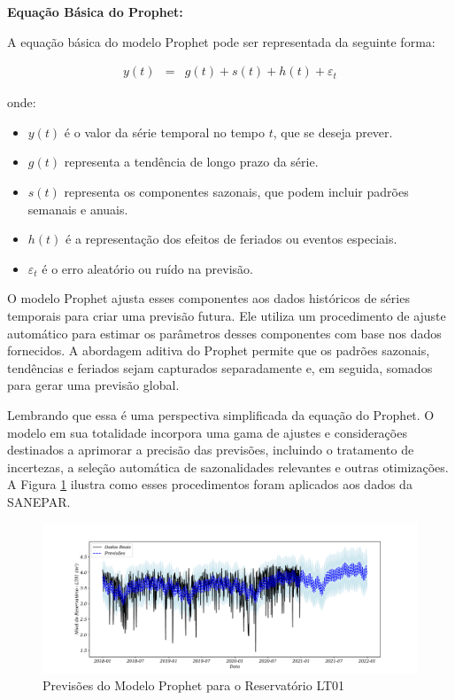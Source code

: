 \textbf{Equação Básica do Prophet:}

A equação básica do modelo Prophet pode ser representada da seguinte forma:

\begin{eqnarray}
	 y(t) &=& g(t) + s(t) + h(t) + \varepsilon_t 
\end{eqnarray}

onde:
\begin{itemize}
	\item \( y(t) \) é o valor da série temporal no tempo \( t \), que se deseja prever.
	\item \( g(t) \) representa a tendência de longo prazo da série.
	\item \( s(t) \) representa os componentes sazonais, que podem incluir padrões semanais e anuais.
	\item \( h(t) \) é a representação dos efeitos de feriados ou eventos especiais.
	\item \( \varepsilon_t \) é o erro aleatório ou ruído na previsão.
\end{itemize}

O modelo Prophet ajusta esses componentes aos dados históricos de séries temporais para criar uma previsão futura. Ele utiliza um procedimento de ajuste automático para estimar os parâmetros desses componentes com base nos dados fornecidos. A abordagem aditiva do Prophet permite que os padrões sazonais, tendências e feriados sejam capturados separadamente e, em seguida, somados para gerar uma previsão global.

Lembrando que essa é uma perspectiva simplificada da equação do Prophet. O modelo em sua totalidade incorpora uma gama de ajustes e considerações destinados a aprimorar a precisão das previsões, incluindo o tratamento de incertezas, a seleção automática de sazonalidades relevantes e outras otimizações. A Figura \ref{fig:prophet1} ilustra como esses procedimentos foram aplicados aos dados da SANEPAR.

\begin{figure}[!htpb]
	\centering
	\caption{Previsões do Modelo Prophet para o Reservatório LT01}\label{fig:prophet1}
	\includegraphics[width=1\linewidth]{Apendices/Figuras/modelagem-24h/prophet1}
	
\end{figure}


